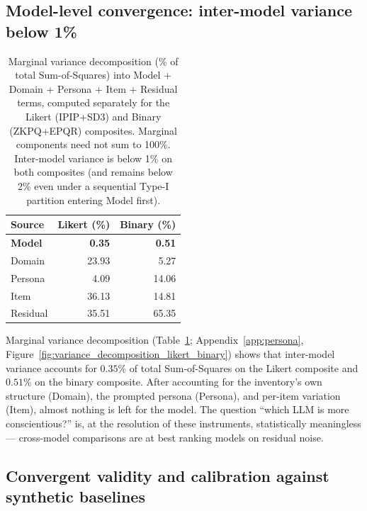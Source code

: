 \documentclass{article}
\begin{document}
\subsection{Model-level convergence: inter-model variance below 1\%}
\label{sec:results-variance}

\begin{table}[t]
\centering
\small
\begin{tabular}{lrr}
\toprule
Source & Likert (\%) & Binary (\%) \\
\midrule
\textbf{Model}    & \textbf{0.35} & \textbf{0.51} \\
Domain   & 23.93 & 5.27  \\
Persona  & 4.09  & 14.06 \\
Item     & 36.13 & 14.81 \\
Residual & 35.51 & 65.35 \\
\bottomrule
\end{tabular}
\caption{Marginal variance decomposition (\% of total Sum-of-Squares) into Model + Domain + Persona + Item + Residual terms, computed separately for the Likert (IPIP+SD3) and Binary (ZKPQ+EPQR) composites. Marginal components need not sum to 100\%. Inter-model variance is below 1\% on both composites (and remains below 2\% even under a sequential Type-I partition entering Model first).}
\label{tab:variance}
\end{table}

Marginal variance decomposition (Table~\ref{tab:variance}; Appendix~\ref{app:persona}, Figure~\ref{fig:variance_decomposition_likert_binary}) shows that inter-model variance accounts for $0.35\%$ of total Sum-of-Squares on the Likert composite and $0.51\%$ on the binary composite. After accounting for the inventory's own structure (Domain), the prompted persona (Persona), and per-item variation (Item), almost nothing is left for the model. The question ``which LLM is more conscientious?'' is, at the resolution of these instruments, statistically meaningless --- cross-model comparisons are at best ranking models on residual noise.

\subsection{Convergent validity and calibration against synthetic baselines}
\label{sec:results-convergent}
\end{document}
